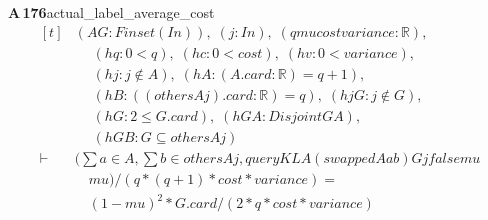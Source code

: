 \documentclass[conference]{IEEEtran}
\theoremstyle{definition}
\newcommand{\lean}[1]{\textsf{\footnotesize #1}}
\begin{document}
\noindent\textbf{A\,176}\quad\lean{actual\_label\_average\_cost}
{\footnotesize\[ \begin{aligned}[t]
&(\mathit{A} \mathit{G} : \mathit{Finset} (\mathit{I} \mathit{n})),\; (\mathit{j} : \mathit{I} \mathit{n}),\; (\mathit{q} \mathit{mu} \mathit{cost} \mathit{variance} : \mathbb{R} ),\\
&\quad \; (\mathit{hq} : 0<\mathit{q}),\; (\mathit{hc} : 0<\mathit{cost}),\; (\mathit{hv} : 0<\mathit{variance}),\\
&\quad \; (\mathit{hj} : \mathit{j} \notin \mathit{A}),\; (\mathit{hA} : (\mathit{A}.\mathit{card}:\mathbb{R} )=\mathit{q}+1),\\
&\quad \; (\mathit{hB} : ((\mathit{others} \mathit{A} \mathit{j}).\mathit{card}:\mathbb{R} )=\mathit{q}),\; (\mathit{hjG} : \mathit{j} \notin \mathit{G}),\\
&\quad \; (\mathit{hG} : 2 \leq \mathit{G}.\mathit{card}),\; (\mathit{hGA} : \mathit{Disjoint} \mathit{G} \mathit{A}),\\
&\quad \; (\mathit{hGB} : \mathit{G} \subseteq \mathit{others} \mathit{A} \mathit{j})\\
\vdash\;&(\textstyle\sum \mathit{a} \in \mathit{A},\textstyle\sum \mathit{b} \in \mathit{others} \mathit{A} \mathit{j},\mathit{queryKL} \mathit{A} (\mathit{swapped} \mathit{A} \mathit{a} \mathit{b}) \mathit{G} \mathit{j} \mathit{false} \mathit{mu}\\
&\quad \mathit{mu})/ (\mathit{q}*(\mathit{q}+1)*\mathit{cost}*\mathit{variance}) =\\
&\quad (1-\mathit{mu})^{2}*\mathit{G}.\mathit{card}/(2*\mathit{q}*\mathit{cost}*\mathit{variance})
\end{aligned} \]}
\end{document}

